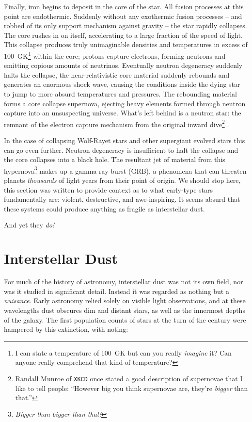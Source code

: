 Finally, iron begins to deposit in the core of the star.
All fusion processes at this point are endothermic.
Suddenly without any exothermic fusion processes -- and robbed of its only support mechanism against gravity -- the star rapidly collapses.
The core rushes in on itself, accelerating to a large fraction of the speed of light.
This collapse produces truly unimaginable densities and temperatures in excess of \SI{100}{\giga\kelvin}\footnote{I can state a temperature of \SI{100}{\giga\kelvin} but can you really \emph{imagine} it? Can anyone really comprehend that kind of temperature?} within the core; protons capture electrons, forming neutrons and emitting copious amounts of neutrinos.
Eventually neutron degeneracy suddenly halts the collapse, the near-relativistic core material suddenly rebounds and generates an enormous shock wave, causing the conditions inside the dying star to jump to more absurd temperatures and pressures.
The rebounding material forms a core collapse supernova, ejecting heavy elements formed through neutron capture into an unsuspecting universe.
What's left behind is a neutron star: the remnant of the electron capture mechanism from the original inward dive\footnote{Randall Munroe of \href{https://what-if.xkcd.com/73/}{\texttt{XKCD}} once stated a good description of supernovae that I like to tell people: ``However big you think supernovae are, they're \emph{bigger} than that.''} \parencite[Ch.~13]{longairHighEnergyAstrophysics2011}.

In the case of collapsing Wolf-Rayet stars and other supergiant evolved stars this can go even further.
Neutron degeneracy is insufficient to halt the collapse and the core collapses into a black hole.
The resultant jet of material from this hypernova\footnote{\emph{Bigger than bigger than that!}} makes up a gamma-ray burst (GRB), a phenomena that can threaten planets \emph{thousands} of light years from their point of origin.
We should stop here, this section was written to provide context as to what early-type stars fundamentally are: violent, destructive, and awe-inspiring.
It seems absurd that these systems could produce anything as fragile as interstellar dust.

And yet they \emph{do!}

\section{Interstellar Dust}
\label{sec:dust}

For much of the history of astronomy, interstellar dust was not its own field, nor was it studied in significant detail.
Instead it was regarded as nothing but a \emph{nuisance}.
Early astronomy relied solely on visible light observations, and at these wavelengths dust obscures dim and distant stars, as well as the innermost depths of the galaxy.
The first population counts of stars at the turn of the  century were hampered by this extinction, with \textcite{kapteynAbsorptionLightSpace1909} noting:

